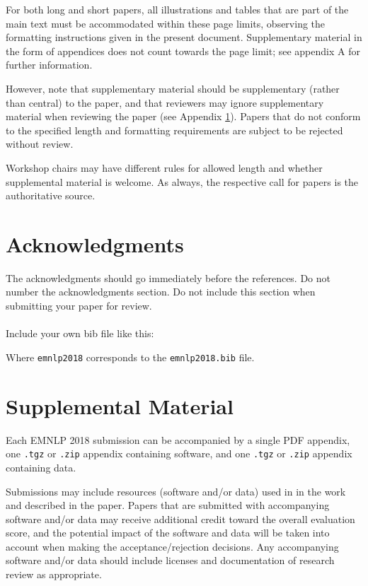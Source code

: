 \documentclass[11pt,a4paper]{article}
\newcommand\confname{EMNLP 2018}
\begin{document}
For both long and short papers, all illustrations and tables that are part
of the main text must be accommodated within these page limits, observing
the formatting instructions given in the present document. Supplementary
material in the form of appendices does not count towards the page limit; see appendix A for further information.

However, note that supplementary material should be supplementary
(rather than central) to the paper, and that reviewers may ignore
supplementary material when reviewing the paper (see Appendix
\ref{sec:supplemental}). Papers that do not conform to the specified
length and formatting requirements are subject to be rejected without
review.

Workshop chairs may have different rules for allowed length and
whether supplemental material is welcome. As always, the respective
call for papers is the authoritative source.

\section*{Acknowledgments}

The acknowledgments should go immediately before the references.  Do
not number the acknowledgments section. Do not include this section
when submitting your paper for review. \\

 \\

Include your own bib file like this:
{\small\verb||
\verb||}

Where \verb|emnlp2018| corresponds to the {\tt emnlp2018.bib} file.



\appendix

\section{Supplemental Material}
\label{sec:supplemental}
Each \confname{} submission can be accompanied by a single PDF
appendix, one {\small\tt.tgz} or {\small\tt.zip} appendix containing
software, and one {\small\tt.tgz} or {\small\tt.zip} appendix
containing data.

Submissions may include resources (software and/or data) used in in
the work and described in the paper. Papers that are submitted with
accompanying software and/or data may receive additional credit toward
the overall evaluation score, and the potential impact of the software
and data will be taken into account when making the
acceptance/rejection decisions. Any accompanying software and/or data
should include licenses and documentation of research review as
appropriate.
\end{document}
